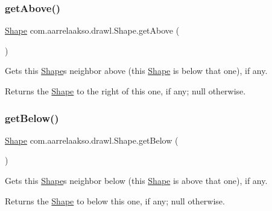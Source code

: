 \subsubsection{\texorpdfstring{get\+Above()}{getAbove()}}
{\footnotesize\ttfamily \hyperlink{classcom_1_1aarrelaakso_1_1drawl_1_1_shape}{Shape} com.\+aarrelaakso.\+drawl.\+Shape.\+get\+Above (\begin{DoxyParamCaption}{ }\end{DoxyParamCaption})\hspace{0.3cm}{\ttfamily [inherited]}}



Gets this \hyperlink{classcom_1_1aarrelaakso_1_1drawl_1_1_shape}{Shape}\textquotesingle{}s neighbor above (this \hyperlink{classcom_1_1aarrelaakso_1_1drawl_1_1_shape}{Shape} is below that one), if any. 

\begin{DoxyReturn}{Returns}
the \hyperlink{classcom_1_1aarrelaakso_1_1drawl_1_1_shape}{Shape} to the right of this one, if any; {\ttfamily null} otherwise. 
\end{DoxyReturn}
\mbox{\label{classcom_1_1aarrelaakso_1_1drawl_1_1_shape_a53de5ab609d879719cd3b372dfe8df58}} 
\subsubsection{\texorpdfstring{get\+Below()}{getBelow()}}
{\footnotesize\ttfamily \hyperlink{classcom_1_1aarrelaakso_1_1drawl_1_1_shape}{Shape} com.\+aarrelaakso.\+drawl.\+Shape.\+get\+Below (\begin{DoxyParamCaption}{ }\end{DoxyParamCaption})\hspace{0.3cm}{\ttfamily [inherited]}}



Gets this \hyperlink{classcom_1_1aarrelaakso_1_1drawl_1_1_shape}{Shape}\textquotesingle{}s neighbor below (this \hyperlink{classcom_1_1aarrelaakso_1_1drawl_1_1_shape}{Shape} is above that one), if any. 

\begin{DoxyReturn}{Returns}
the \hyperlink{classcom_1_1aarrelaakso_1_1drawl_1_1_shape}{Shape} to below this one, if any; {\ttfamily null} otherwise. 
\end{DoxyReturn}
\mbox{\label{classcom_1_1aarrelaakso_1_1drawl_1_1_shape_aba14efe9a16c0808580963c66b171082}} 
